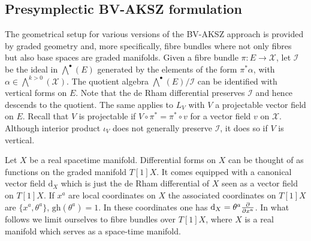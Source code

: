 \documentclass[a4paper,12pt]{article}
\numberwithin{equation}{section} %
\newcommand{\gh}[1]{\mathrm{gh}(#1)}
\newcommand{\dx}{\mathrm{d}_X}
\renewcommand{\d}{\partial}
\newcommand{\ffrac}[2]{\raisebox{.5pt}%
  {\footnotesize$\displaystyle\frac{#1}{#2}$}\kern1pt}
\newcommand{\dl}[1]{\mathchoice{\ffrac{\d}{\d #1}}{\frac{\d}{\d #1}}{\ffrac{\d}{\d #1}}{\ffrac{\d}{\d #1}}}
\def\cI{\mathcal{I}}
\def\cX{\mathcal{X}}
\begin{document}
\fi
\subsection{Presymplectic BV-AKSZ formulation}



The geometrical setup for various versions of the BV-AKSZ approach is provided by graded geometry and, more specifically, fibre bundles where not only fibres but also base spaces are graded manifolds. Given a fibre bundle $\pi: E\to \cX$, let $\cI$ be the ideal in $ \bigwedge^\bullet(E) $ generated by the elements of the form $\pi^*\alpha$, with $\alpha \in \bigwedge^{k>0}(\cX)$. The quotient algebra $ \bigwedge^\bullet(E) /\cI$ can be identified with vertical forms on $E$. Note that the de Rham differential preserves $\cI$ and hence descends to the quotient. The same applies to $L_V$ with $V$ a projectable vector
field on $E$. Recall that $V$ is projectable if $ V \circ \pi^* = \pi^* \circ v $ for a vector field $v$ on $\cX$. Although interior product $\iota_V$ does not generally preserve $\cI$,  it does so if $V$ is vertical.


Let $X$ be a real spacetime manifold. Differential forms on $X$ can be thought of as functions on the graded manifold $T[1]X$. It comes equipped with a canonical vector field  $\dx$ which is just the de Rham differential of $X$ seen as a vector field on $T[1]X$. If $x^a$ are local coordinates on $X$ the associated coordinates on $T[1]X$ are $ \{x^a,\theta^a\} $, $\gh{\theta^a}=1$. In these coordinates one has $\dx=\theta^a\dl{x^a}$. In what follows we limit ourselves to fibre bundles over $T[1]X$, where $X$ is a real manifold which serves as a space-time manifold.  
\end{document}
